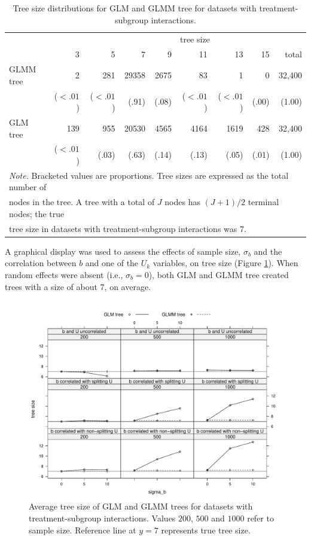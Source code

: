 \documentclass[nobf,doc]{apa}
\begin{document}
\begin{table}[!htbp]
\caption{Tree size distributions for GLM and GLMM tree for datasets with treatment-subgroup interactions.}
\small
\begin{tabular}{lrrrrrrrr}
	\thickline
	&&\multicolumn{7}{c}{tree size}\\
	\cline{2-8}
	&     3   &   5   &   7   &   9   &  11  &   13   &   15  & total \\
	\hline
  	GLMM tree	& 2 & 281& 29358 & 2675 & 83 & 1 &0& 32,400 \\
				&  ($<.01$)  & ($<.01$)& (.91) & ($.08$) & ($<.01$) & ($<.01$) &(.00)& (1.00) \\

  	GLM tree		& 139 & 955 & 20530 & 4565 & 4164 & 1619 & 428 & 32,400\\ 
 			 	& ($<.01$) & (.03) & (.63) & (.14) & (.13) & (.05) & (.01) & (1.00) \\ 
	\hline
  	\multicolumn{9}{l}{\textit{Note. } Bracketed values are proportions. Tree sizes are expressed as the total number of}\\
  	\multicolumn{9}{l}{nodes in the tree. A tree with a total of $J$ nodes has $(J+1)/2$ terminal nodes; the true}\\	
  	\multicolumn{8}{l}{tree size in datasets with treatment-subgroup interactions was 7.}\\
\end{tabular}
\label{tab:treesize_interactions}
\end{table}

A graphical display was used to assess the effects of sample size, $\sigma_b$ and the correlation between $b$ and one of the $U_k$ variables, on tree size (Figure \ref{fig:xyplot_treesize_interact}). When random effects were absent (i.e., $\sigma_{b}=0$), both GLM and GLMM tree created trees with a size of about 7, on average. 

\begin{figure}[!htbp]
	\includegraphics[width=15cm]{xy_treesizes_treatsubs.pdf}
	\caption{Average tree size of GLM and GLMM trees for datasets with treatment-subgroup interactions. Values $200$, $500$ and $1000$ refer to sample size. Reference line at $y=7$ represents true tree size.}
	\label{fig:xyplot_treesize_interact}
\end{figure}
\end{document}
